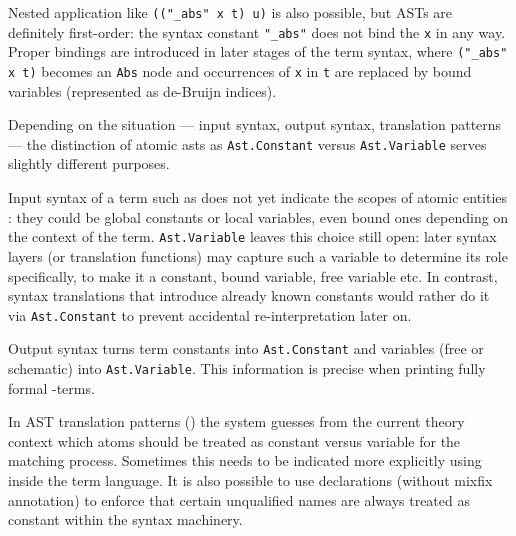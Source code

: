 \begin{isabellebody}
\begin{isamarkuptext}
  Nested application like \verb|(("_abs" x t) u)| is also
  possible, but ASTs are definitely first-order: the syntax constant
  \verb|"_abs"| does not bind the \verb|x| in any way.
  Proper bindings are introduced in later stages of the term syntax,
  where \verb|("_abs" x t)| becomes an \verb|Abs| node and
  occurrences of \verb|x| in \verb|t| are replaced by bound
  variables (represented as de-Bruijn indices).%
\end{isamarkuptext}%
\isamarkuptrue%
%
\isamarkuptrue%
%
\begin{isamarkuptext}%
Depending on the situation --- input syntax, output syntax,
  translation patterns --- the distinction of atomic asts as \verb|Ast.Constant| versus \verb|Ast.Variable| serves slightly different
  purposes.

  Input syntax of a term such as  does not yet
  indicate the scopes of atomic entities : they
  could be global constants or local variables, even bound ones
  depending on the context of the term.  \verb|Ast.Variable| leaves
  this choice still open: later syntax layers (or translation
  functions) may capture such a variable to determine its role
  specifically, to make it a constant, bound variable, free variable
  etc.  In contrast, syntax translations that introduce already known
  constants would rather do it via \verb|Ast.Constant| to prevent
  accidental re-interpretation later on.

  Output syntax turns term constants into \verb|Ast.Constant| and
  variables (free or schematic) into \verb|Ast.Variable|.  This
  information is precise when printing fully formal -terms.

  In AST translation patterns () the system
  guesses from the current theory context which atoms should be
  treated as constant versus variable for the matching process.
  Sometimes this needs to be indicated more explicitly using  inside the term language.  It is also possible to use
  \hyperlink{command.syntax}{\mbox{}} declarations (without mixfix annotation) to
  enforce that certain unqualified names are always treated as
  constant within the syntax machinery.


\end{isamarkuptext}
\end{isabellebody}
